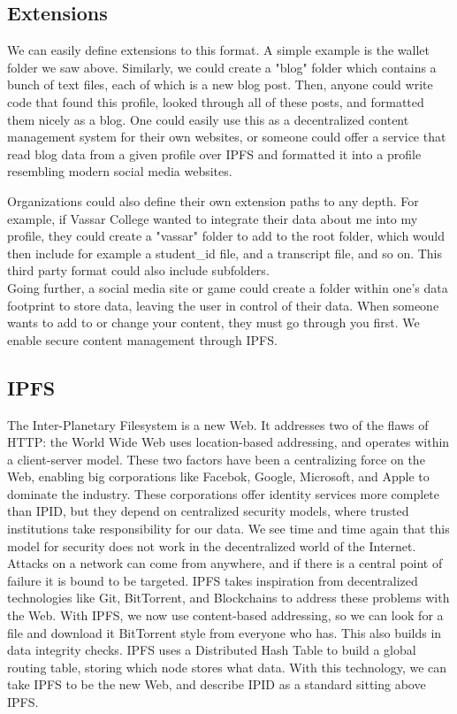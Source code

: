 \documentclass{article}
\begin{document}
\subsection{Extensions}

We can easily define extensions to this format. A simple example is the wallet folder we saw above. Similarly, we could create a "blog" folder which contains a bunch of text files, each of which is a new blog post. Then, anyone could write code that found this profile, looked through all of these posts, and formatted them nicely as a blog. One could easily use this as a decentralized content management system for their own websites, or someone could offer a service that read blog data from a given profile over IPFS and formatted it into a profile resembling modern social media websites. \par
Organizations could also define their own extension paths to any depth. For example, if Vassar College wanted to integrate their data about me into my profile, they could create a "vassar" folder to add to the root folder, which would then include for example a student\_id file, and a transcript file, and so on. This third party format could also include subfolders. \\
Going further, a social media site or game could create a folder within one's data footprint to store data, leaving the user in control of their data. When someone wants to add to or change your content, they must go through you first. We enable secure content management through IPFS.

\subsection{IPFS}

The Inter-Planetary Filesystem is a new Web. It addresses two of the flaws of HTTP: the World Wide Web uses location-based addressing, and operates within a client-server model. These two factors have been a centralizing force on the Web, enabling big corporations like Facebok, Google, Microsoft, and Apple to dominate the industry. These corporations offer identity services more complete than IPID, but they depend on centralized security models, where trusted institutions take responsibility for our data. We see time and time again that this model for security does not work in the decentralized world of the Internet. Attacks on a network can come from anywhere, and if there is a central point of failure it is bound to be targeted. IPFS takes inspiration from decentralized technologies like Git, BitTorrent, and Blockchains to address these problems with the Web. With IPFS, we now use content-based addressing, so we can look for a file and download it BitTorrent style from everyone who has. This also builds in data integrity checks. IPFS uses a Distributed Hash Table to build a global routing table, storing which node stores what data. With this technology, we can take IPFS to be the new Web, and describe IPID as a standard sitting above IPFS.
\end{document}
